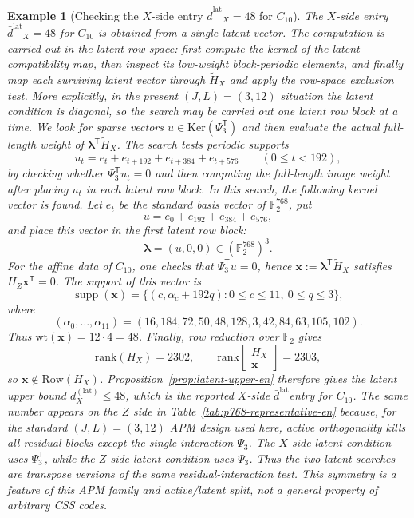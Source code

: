 \documentclass[11pt]{article}
\newcommand{\Ftwo}{\mathbb{F}_2}
\newcommand{\Ker}{\mathrm{Ker}}
\newcommand{\Row}{\mathrm{Row}}
\newcommand{\rank}{\mathrm{rank}}
\newcommand{\wt}{\mathrm{wt}}
\newcommand{\Htil}{\tilde{H}}
\newcommand{\dbound}[1]{\ensuremath{\bar{d}^{\mathrm{#1}}}}
\newcommand{\dlat}{\dbound{lat}}
\newcommand{\markededit}[1]{#1}
\newcommand{\vect}[1]{\bm{#1}}
\newcommand{\vx}{\vect{x}}
\newcommand{\vlambda}{\vect{\lambda}}
\theoremstyle{uprightthm}
\newtheorem{example}[theorem]{Example}
\begin{document}
\begin{example}[Checking the $X$-side entry $\dlat_X=48$ for $C_{10}$]
The $X$-side entry $\dlat_X=48$ for $C_{10}$ is \markededit{obtained from} a single latent
vector.  The computation is carried out in the latent row space: first compute
the kernel of the latent compatibility map, then inspect its low-weight
block-periodic elements, and finally map each surviving latent vector through
$\Htil_X$ and apply the row-space exclusion test.  More explicitly, in the
present $(J,L)=(3,12)$ situation the latent condition is diagonal, so the
search may be carried out one latent row block at a time.  We look for sparse
vectors $u\in\Ker(\Psi_3^{\mathsf T})$ and then evaluate the actual full-length
weight of $\vlambda^{\mathsf T}\Htil_X$.  The search tests periodic supports
\[
u_t=e_t+e_{t+192}+e_{t+384}+e_{t+576}\qquad(0\le t<192),
\]
by checking whether $\Psi_3^{\mathsf T}u_t=0$ and then computing the full-length
image weight after placing $u_t$ in each latent row block.  In this search, the following kernel
vector is found.  Let $e_t$ be the standard basis vector of $\Ftwo^{768}$, put
\[
u=e_0+e_{192}+e_{384}+e_{576},
\]
and place this vector in the first latent row block:
\[
\vlambda=(u,0,0)\in(\Ftwo^{768})^3.
\]
For the affine data of $C_{10}$, one checks that
$\Psi_3^{\mathsf T}u=0$, hence
$\vx:=\vlambda^{\mathsf T}\Htil_X$ satisfies $H_Z\vx^{\mathsf T}=0$.
The support of this vector is
\[
\operatorname{supp}(\vx)
=
\{(c,\alpha_c+192q):0\le c\le 11,\ 0\le q\le 3\},
\]
where
\[
(\alpha_0,\ldots,\alpha_{11})
=(16,184,72,50,48,128,3,42,84,63,105,102).
\]
Thus $\wt(\vx)=12\cdot 4=48$.  Finally, row reduction over $\Ftwo$ gives
\[
\rank(H_X)=2302,\qquad
\rank\!\begin{bmatrix}H_X\\ \vx\end{bmatrix}=2303,
\]
so $\vx\notin\Row(H_X)$.  Proposition~\ref{prop:latent-upper-en} therefore
\markededit{gives} the latent upper bound $d_X^{(\mathrm{lat})}\le 48$, which is the
reported $X$-side \dlat entry for $C_{10}$.
The same number appears on the $Z$ side in Table~\ref{tab:p768-representative-en}
because, for the standard $(J,L)=(3,12)$ APM design used here, active
orthogonality kills all residual blocks except the single interaction
$\Psi_3$.  The $X$-side latent condition uses $\Psi_3^{\mathsf T}$, while the
$Z$-side latent condition uses $\Psi_3$.  Thus the two latent searches are
transpose versions of the same residual-interaction test.  This symmetry is a
feature of this APM family and active/latent split, not a general property of
arbitrary CSS codes.
\end{example}
\end{document}
